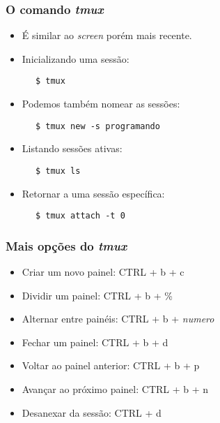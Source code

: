\documentclass{beamer}
\begin{document}
   \begin{frame}[fragile]
      \frametitle{O comando \textit{tmux}}
      \begin{itemize}
         \item É similar ao \textit{screen} porém mais recente.
         \item Inicializando uma sessão:
      \end{itemize}
   
      \begin{verbatim}
      $ tmux	      
      \end{verbatim}

      \begin{itemize}
         \item Podemos também nomear as sessões:
      \end{itemize}

      \begin{verbatim}
      $ tmux new -s programando	      
      \end{verbatim}

      \begin{itemize}
         \item Listando sessões ativas:
      \end{itemize}

      \begin{verbatim}
      $ tmux ls
      \end{verbatim}

      \begin{itemize}
         \item  Retornar a uma sessão específica:
      \end{itemize}
     
      \begin{verbatim}
      $ tmux attach -t 0 
      \end{verbatim}
\end{frame}

   \begin{frame}
      \frametitle{Mais opções do \textit{tmux}}
      \begin{itemize}
         \item Criar um novo painel: CTRL + b + c
         \item Dividir um painel: CTRL + b + \%
         \item Alternar entre painéis: CTRL + b + \textit{numero}
         \item Fechar um painel: CTRL + b + d
         \item Voltar ao painel anterior: CTRL + b + p
         \item Avançar ao próximo painel: CTRL + b + n
         \item Desanexar da sessão: CTRL + d
      \end{itemize}
   \end{frame}
\end{document}
